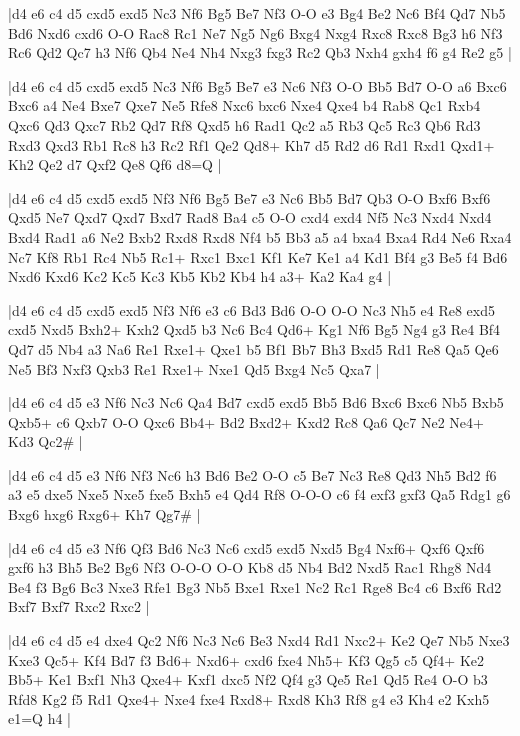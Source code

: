 \whitename{}
\blackname{}
\makegametitle
|d4 e6 c4 d5 cxd5 exd5 Nc3 Nf6 Bg5 Be7 Nf3 O-O e3 Bg4 Be2 Nc6 Bf4 Qd7 Nb5 Bd6 Nxd6 cxd6 O-O Rac8 Rc1 Ne7 Ng5 Ng6 Bxg4 Nxg4 Rxc8 Rxc8 Bg3 h6 Nf3 Rc6 Qd2 Qc7 h3 Nf6 Qb4 Ne4 Nh4 Nxg3 fxg3 Rc2 Qb3 Nxh4 gxh4 f6 g4 Re2 g5  |

\whitename{}
\blackname{}
\makegametitle
|d4 e6 c4 d5 cxd5 exd5 Nc3 Nf6 Bg5 Be7 e3 Nc6 Nf3 O-O Bb5 Bd7 O-O a6 Bxc6 Bxc6 a4 Ne4 Bxe7 Qxe7 Ne5 Rfe8 Nxc6 bxc6 Nxe4 Qxe4 b4 Rab8 Qc1 Rxb4 Qxc6 Qd3 Qxc7 Rb2 Qd7 Rf8 Qxd5 h6 Rad1 Qc2 a5 Rb3 Qc5 Rc3 Qb6 Rd3 Rxd3 Qxd3 Rb1 Rc8 h3 Rc2 Rf1 Qe2 Qd8+ Kh7 d5 Rd2 d6 Rd1 Rxd1 Qxd1+ Kh2 Qe2 d7 Qxf2 Qe8 Qf6 d8=Q  |

\whitename{}
\blackname{}
\makegametitle
|d4 e6 c4 d5 cxd5 exd5 Nf3 Nf6 Bg5 Be7 e3 Nc6 Bb5 Bd7 Qb3 O-O Bxf6 Bxf6 Qxd5 Ne7 Qxd7 Qxd7 Bxd7 Rad8 Ba4 c5 O-O cxd4 exd4 Nf5 Nc3 Nxd4 Nxd4 Bxd4 Rad1 a6 Ne2 Bxb2 Rxd8 Rxd8 Nf4 b5 Bb3 a5 a4 bxa4 Bxa4 Rd4 Ne6 Rxa4 Nc7 Kf8 Rb1 Rc4 Nb5 Rc1+ Rxc1 Bxc1 Kf1 Ke7 Ke1 a4 Kd1 Bf4 g3 Be5 f4 Bd6 Nxd6 Kxd6 Kc2 Kc5 Kc3 Kb5 Kb2 Kb4 h4 a3+ Ka2 Ka4 g4  |

\whitename{}
\blackname{}
\makegametitle
|d4 e6 c4 d5 cxd5 exd5 Nf3 Nf6 e3 c6 Bd3 Bd6 O-O O-O Nc3 Nh5 e4 Re8 exd5 cxd5 Nxd5 Bxh2+ Kxh2 Qxd5 b3 Nc6 Bc4 Qd6+ Kg1 Nf6 Bg5 Ng4 g3 Re4 Bf4 Qd7 d5 Nb4 a3 Na6 Re1 Rxe1+ Qxe1 b5 Bf1 Bb7 Bh3 Bxd5 Rd1 Re8 Qa5 Qe6 Ne5 Bf3 Nxf3 Qxb3 Re1 Rxe1+ Nxe1 Qd5 Bxg4 Nc5 Qxa7  |

\whitename{}
\blackname{}
\makegametitle
|d4 e6 c4 d5 e3 Nf6 Nc3 Nc6 Qa4 Bd7 cxd5 exd5 Bb5 Bd6 Bxc6 Bxc6 Nb5 Bxb5 Qxb5+ c6 Qxb7 O-O Qxc6 Bb4+ Bd2 Bxd2+ Kxd2 Rc8 Qa6 Qc7 Ne2 Ne4+ Kd3 Qc2\#  |

\whitename{}
\blackname{}
\makegametitle
|d4 e6 c4 d5 e3 Nf6 Nf3 Nc6 h3 Bd6 Be2 O-O c5 Be7 Nc3 Re8 Qd3 Nh5 Bd2 f6 a3 e5 dxe5 Nxe5 Nxe5 fxe5 Bxh5 e4 Qd4 Rf8 O-O-O c6 f4 exf3 gxf3 Qa5 Rdg1 g6 Bxg6 hxg6 Rxg6+ Kh7 Qg7\#  |

\whitename{}
\blackname{}
\makegametitle
|d4 e6 c4 d5 e3 Nf6 Qf3 Bd6 Nc3 Nc6 cxd5 exd5 Nxd5 Bg4 Nxf6+ Qxf6 Qxf6 gxf6 h3 Bh5 Be2 Bg6 Nf3 O-O-O O-O Kb8 d5 Nb4 Bd2 Nxd5 Rac1 Rhg8 Nd4 Be4 f3 Bg6 Bc3 Nxe3 Rfe1 Bg3 Nb5 Bxe1 Rxe1 Nc2 Rc1 Rge8 Bc4 c6 Bxf6 Rd2 Bxf7 Bxf7 Rxc2 Rxc2  |

\whitename{}
\blackname{}
\makegametitle
|d4 e6 c4 d5 e4 dxe4 Qc2 Nf6 Nc3 Nc6 Be3 Nxd4 Rd1 Nxc2+ Ke2 Qe7 Nb5 Nxe3 Kxe3 Qc5+ Kf4 Bd7 f3 Bd6+ Nxd6+ cxd6 fxe4 Nh5+ Kf3 Qg5 c5 Qf4+ Ke2 Bb5+ Ke1 Bxf1 Nh3 Qxe4+ Kxf1 dxc5 Nf2 Qf4 g3 Qe5 Re1 Qd5 Re4 O-O b3 Rfd8 Kg2 f5 Rd1 Qxe4+ Nxe4 fxe4 Rxd8+ Rxd8 Kh3 Rf8 g4 e3 Kh4 e2 Kxh5 e1=Q h4  |

